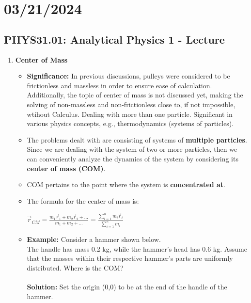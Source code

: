\documentclass{article}
\begin{document}
\section*{03/21/2024}
\subsection*{PHYS31.01: Analytical Physics 1 - Lecture}
    \begin{enumerate}
    \item \textbf{Center of Mass}
        \begin{itemize}
            \item \noindent\textbf{Significance:} In previous discussions, pulleys were considered to be frictionless and massless in order to ensure ease of calculation. Additionally, the topic of center of mass is not discussed yet, making the solving of non-massless and non-frictionless close to, if not impossible, wtihout Calculus. Dealing with more than one particle. Significant in various physics concepts, e.g., thermodynamics (systems of particles).\\
            \item \noindent The problems dealt with are consisting of systems of \textbf{multiple particles}. Since we are dealing with the system of two or more particles, then we can conveniently analyze the dynamics of the system by considering its \textbf{center of mass (COM)}.\\
            \item \noindent COM pertains to the point where the system is \textbf{concentrated at}.
            \item \noindent The formula for the center of mass is:\\
            \begin{center}$\vec{r}_{CM}=\frac{m_1\vec{r}_1+m_2\vec{r}_2+...}{m_1+m_2+...}=\frac{\sum_{i=1}^{n} m_i\vec{r}_i}{\sum_{i=1}^{n} m_i}$\end{center}
            \item \noindent\textbf{Example:} Consider a hammer shown below.\\
            \noindent The handle has mass 0.2 kg, while the hammer's head has 0.6 kg. Assume that the masses within their respective hammer's parts are uniformly distributed. Where is the COM?\\\\
            \noindent\textbf{Solution:} Set the origin (0,0) to be at the end of the handle of the hammer.\\

\end{itemize}
\end{enumerate}
\end{document}
